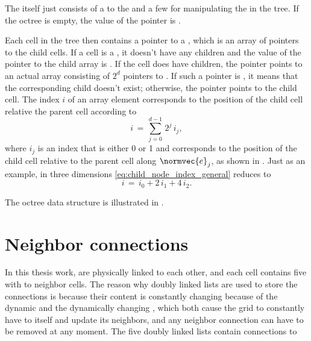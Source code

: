 The \octree itself just consists of a \pointer to the  and a few \methods for manipulating the \cells in the tree. If the octree is empty, the value of the pointer is \NULL.

Each cell in the tree then contains a pointer to a , which is an array of pointers to the child cells. If a cell is a , it doesn't have any children and the value of the pointer to the child array is \NULL. If the cell does have children, the pointer points to an actual array consisting of $2^d$ pointers to . If such a pointer is \NULL, it means that the corresponding child doesn't exist; otherwise, the pointer points to the child cell. The index $i$ of an array element corresponds to the position of the child cell relative the parent cell according to
%
\begin{equation} \label{eq:child_node_index_general}
i \,=\, \sum_{j=0}^{d-1} \,2^j\,i_j,
\end{equation}
%
where $i_j$ is an index that is either 0 or 1 and corresponds to the position of the child cell relative to the parent cell along $\normvec{e}_j$, as shown in . Just as an example, in three dimensions \eqref{eq:child_node_index_general} reduces to
%
\begin{equation} \label{eq:child_node_index_three_dimensions}
i \,=\, i_0 + 2\,i_1 + 4\,i_2.
\end{equation}

The octree data structure is illustrated in .

\section{Neighbor connections}

In this thesis work,  are physically linked to each other, and each cell contains five  with  to neighbor cells. The reason why doubly linked lists are used to store the connections is because their content is constantly changing because of the dynamic  and the dynamically changing \LODs, which both cause the grid to constantly have to \remesh itself and update its neighbors, and any neighbor connection can have to be removed at any moment. The five doubly linked lists contain connections to

